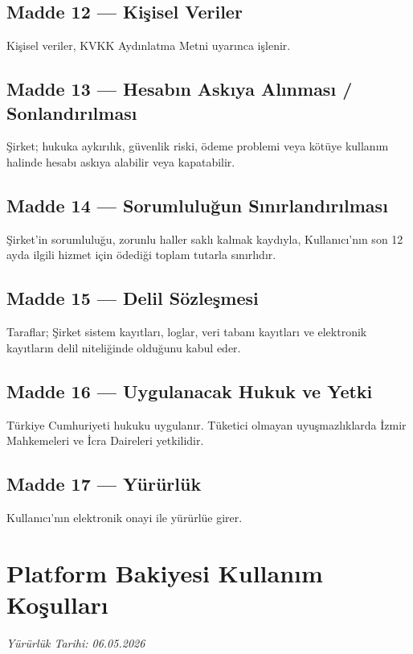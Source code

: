 \documentclass[12pt,a4paper]{article}
\begin{document}
\subsection*{Madde 12 --- Ki\c{s}isel Veriler}
Ki\c{s}isel veriler, KVKK Ayd{\i}nlatma Metni uyar{\i}nca i\c{s}lenir.

\subsection*{Madde 13 --- Hesab{\i}n Ask{\i}ya Al{\i}nmas{\i} / Sonland{\i}r{\i}lmas{\i}}
\c{S}irket; hukuka ayk{\i}r{\i}l{\i}k, g\"{u}venlik riski, \"{o}deme problemi veya k\"{o}t\"{u}ye kullan{\i}m halinde
hesab{\i} ask{\i}ya alabilir veya kapatabilir.

\subsection*{Madde 14 --- Sorumlulu\u{g}un S{\i}n{\i}rland{\i}r{\i}lmas{\i}}
\c{S}irket'in sorumlulu\u{g}u, zorunlu haller sakl{\i} kalmak kayd{\i}yla, Kullan{\i}c{\i}'n{\i}n son 12 ayda
ilgili hizmet i\c{c}in \"{o}dedi\u{g}i toplam tutarla s{\i}n{\i}rl{\i}d{\i}r.

\subsection*{Madde 15 --- Delil S\"{o}zle\c{s}mesi}
Taraflar; \c{S}irket sistem kay{\i}tlar{\i}, loglar, veri taban{\i} kay{\i}tlar{\i} ve elektronik kay{\i}tlar{\i}n
delil niteli\u{g}inde oldu\u{g}unu kabul eder.

\subsection*{Madde 16 --- Uygulanacak Hukuk ve Yetki}
T\"{u}rkiye Cumhuriyeti hukuku uygulan{\i}r. T\"{u}ketici olmayan uyu\c{s}mazl{\i}klarda \.{I}zmir
Mahkemeleri ve \.{I}cra Daireleri yetkilidir.

\subsection*{Madde 17 --- Y\"{u}r\"{u}rl\"{u}k}
Kullan{\i}c{\i}'n{\i}n elektronik onayi ile y\"{u}r\"{u}rl\"{u}e girer.

\section{Platform Bakiyesi Kullan{\i}m Ko\c{s}ullar{\i}}
\textit{Y\"{u}r\"{u}rl\"{u}k Tarihi: 06.05.2026}
\end{document}
